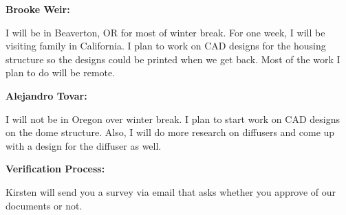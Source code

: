 \documentclass[10pt,draftclsnofoot,onecolumn,letterpaper]{article}
\begin{document}
{\fontsize{12pt}{16.8pt}\selectfont \textbf{Brooke Weir: }\par}
{\fontsize{10pt}{12.0pt}\selectfont I will be in Beaverton, OR for most of winter break. For one week, I will be visiting family in California. I plan to work on CAD designs for the housing structure so the designs could be printed when we get back. Most of the work I plan to do will be remote. \\
\par}\par

{\fontsize{12pt}{16.8pt}\selectfont \textbf{Alejandro Tovar: }\par}
{\fontsize{10pt}{12.0pt}\selectfont I will not be in Oregon over winter break. I plan to start work on CAD designs on the dome structure. Also, I will do more research on diffusers and come up with a design for the diffuser as well.\\
\par}\par

{\fontsize{12pt}{16.8pt}\selectfont \textbf{Verification Process: }\par}
{\fontsize{10pt}{12.0pt}\selectfont Kirsten will send you a survey via email that asks whether you approve of our documents or not.\\
\par}\par
\end{document}
